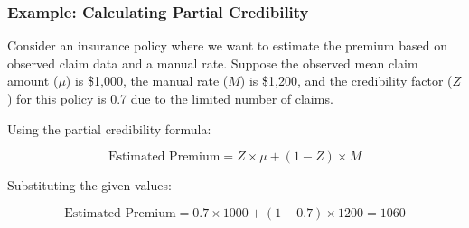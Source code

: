 \documentclass[compress,mathserif]{beamer}
\begin{document}
\begin{frame}
\frametitle{Example: Calculating Partial Credibility}

Consider an insurance policy where we want to estimate the premium based on observed claim data and a manual rate. Suppose the observed mean claim amount (\(\mu\)) is \$1,000, the manual rate (\(M\)) is \$1,200, and the credibility factor (\(Z\)) for this policy is 0.7 due to the limited number of claims.

Using the partial credibility formula:

\[
\text{Estimated Premium} = Z \times \mu + (1 - Z) \times M
\]

Substituting the given values:

\[
\text{Estimated Premium} = 0.7 \times 1000 + (1 - 0.7) \times 1200 = 1060
\]



\end{frame}
\end{document}
